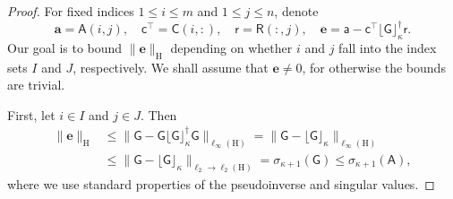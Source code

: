 \documentclass[onefignum,onetabnum]{siamart250211}
\renewenvironment{equation*}{\[}{\]\ignorespacesafterend}
\newcommand{\Hilb}{\mathrm{H}}
\newcommand{\Batrix}[1]{\bm{\Matrix{#1}}}
\newcommand{\Matrix}[1]{\mathsf{#1}}
\newcommand{\Bentry}[1]{{\bm{#1}}}
\newcommand{\trans}{\intercal}
\newcommand{\pinv}{\dagger}
\newcommand{\truncate}[3][]{#1\lfloor #2 #1\rfloor_{#3}}
\newcommand{\Index}[1]{{#1}}
\newcommand{\Norm}[3][]{#1\| #2 #1\|_{\mathrm{#3}}}
\begin{document}
\begin{proof}
For fixed indices $1 \leq i \leq m$ and $1 \leq j \leq n$, denote
\begin{equation*}
    \Bentry{a} = \Batrix{A}(i, j), \quad \Batrix{c}^\trans = \Batrix{C}(i, :), \quad  \Batrix{r} = \Batrix{R}(:, j), \quad \Bentry{e} = \Batrix{a} - \Batrix{c}^\trans \truncate{\Batrix{G}}{\kappa}^\pinv \Batrix{r}. 
\end{equation*}
Our goal is to bound $\Norm{\Bentry{e}}{\Hilb}$ depending on whether $i$ and $j$ fall into the index sets $\Index{I}$ and $\Index{J}$, respectively.
We shall assume that $\Bentry{e} \neq 0$, for otherwise the bounds are trivial.

First, let $i \in \Index{I}$ and $j \in \Index{J}$.
Then
\begin{align*}
    \Norm{\Bentry{e}}{\Hilb} &\leq \Norm{\Batrix{G} - \Batrix{G} \truncate{\Batrix{G}}{\kappa}^\pinv \Batrix{G}}{\ell_{\infty}(\Hilb)} = \Norm{\Batrix{G} - \truncate{\Batrix{G}}{\kappa}}{\ell_{\infty}(\Hilb)} \\
    &\leq \Norm{\Batrix{G} - \truncate{\Batrix{G}}{\kappa}}{\ell_2 \to \ell_2(\Hilb)} = \sigma_{\kappa + 1}(\Batrix{G}) \leq \sigma_{\kappa + 1}(\Batrix{A}),
\end{align*}
where we use standard properties of the pseudoinverse and singular values.


\end{proof}
\end{document}
